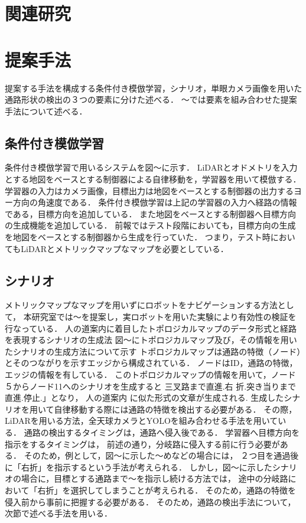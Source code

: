 \documentclass{jarticle}
\begin{document}
\section{関連研究}
\section{提案手法}
提案する手法を構成する条件付き模倣学習，シナリオ，単眼カメラ画像を用いた通路形状の検出の３つの要素に分けた述べる．
〜では要素を組み合わせた提案手法について述べる．
\subsection{条件付き模倣学習}
条件付き模倣学習で用いるシステムを図〜に示す．
LiDARとオドメトリを入力とする地図をベースとする制御器による自律移動を，学習器を用いて模倣する．
学習器の入力はカメラ画像，目標出力は地図をベースとする制御器の出力するヨー方向の角速度である．
条件付き模倣学習は上記の学習器の入力へ経路の情報である，目標方向を追加している．
また地図をベースとする制御器へ目標方向の生成機能を追加している．
前報ではテスト段階においても，目標方向の生成を地図をベースとする制御器から生成を行っていた．
つまり，テスト時においてもLiDARとメトリックマップなマップを必要としている．
\subsection{シナリオ}
メトリックマップなマップを用いずにロボットをナビゲーションする方法として，
本研究室では〜を提案し，実ロボットを用いた実験により有効性の検証を行なっている．
人の道案内に着目したトポロジカルマップのデータ形式と経路を表現するシナリオの生成法
図〜にトポロジカルマップ及び，その情報を用いたシナリオの生成方法について示す
トポロジカルマップは通路の特徴（ノード）とそのつながりを示すエッジから構成されている．
ノードはID，通路の特徴，エッジの情報を有している．
このトポロジカルマップの情報を用いて，ノード５からノード11へのシナリオを生成すると
三叉路まで直進.右 折.突き当りまで直進.停止.」となり，
人の道案内 に似た形式の文章が生成される.
生成したシナリオを用いて自律移動する際には通路の特徴を検出する必要がある．
その際，LiDARを用いる方法，全天球カメラとYOLOを組み合わせる手法を用いている．
通路の検出するタイミングは，通路へ侵入後である．
学習器へ目標方向を指示をするタイミングは，
前述の通り，分岐路に侵入する前に行う必要がある．
そのため，例として，図〜に示した〜めなどの場合には，
２つ目を通過後に「右折」を指示するという手法が考えられる．
しかし，図〜に示したシナリオの場合に，目標とする通路まで〜を指示し続ける方法では，
途中の分岐路において「右折」を選択してしまうことが考えられる．
そのため，通路の特徴を侵入前から事前に把握する必要がある．
そのため，通路の検出手法について，次節で述べる手法を用いる．
\end{document}
